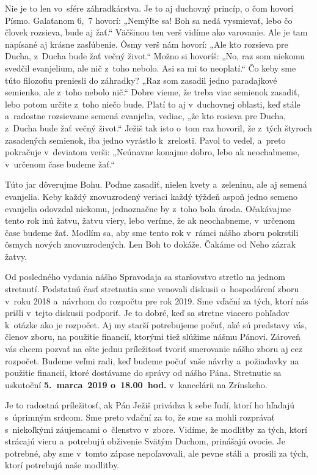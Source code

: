 Nie je to len vo~sfére záhradkárstva. Je to aj duchovný princíp, o čom hovorí Písmo. Galaťanom 6,~7 hovorí: „Nemýľte sa! Boh sa nedá vysmievať, lebo čo človek rozsieva, bude aj žať.“ Väčšinou ten verš vidíme ako varovanie. Ale je tam napísané aj krásne zasľúbenie. Ôsmy verš nám hovorí: „Ale kto rozsieva pre Ducha, z~Ducha bude žať večný život.“ Možno si hovoríš: „No, raz som niekomu svedčil evanjelium, ale nič z~toho nebolo. Asi sa mi to neoplatí.“ Čo keby sme túto filozofiu preniesli do záhradky? „Raz som zasadil jedno paradajkové semienko, ale z~toho nebolo nič.“ Dobre vieme, že treba viac semienok zasadiť, lebo potom určite z~toho niečo bude. Platí to aj v~duchovnej oblasti, keď stále a~radostne rozsievame semená evanjelia, vediac, „že kto rosieva pre Ducha, z~Ducha bude žať večný život.“ Ježiš tak isto o~tom raz hovoril, že z~tých štyroch zasadených semienok, iba jedno vyrástlo k~zrelosti. Pavol to vedel, a~preto pokračuje v~deviatom verši: „Neúnavne konajme dobro, lebo ak neochabneme, v~určenom čase budeme žať.“

Túto jar dôverujme Bohu. Poďme zasadiť, nielen kvety a~zeleninu, ale aj semená evanjelia. Keby každý znovuzrodený veriaci každý týždeň aspoň jedno semeno evanjelia odovzdal niekomu, jednoznačne by z~toho bola úroda. Očakávajme tento rok inú žatvu, žatvu viery, lebo veríme, že ak neochabneme, v~určenom čase budeme žať. Modlím sa, aby sme tento rok v~rámci nášho zboru pokrstili ôsmych nových znovuzrodených. Len Boh to dokáže. Čakáme od Neho zázrak žatvy.



Od posledného vydania nášho Spravodaja sa staršovstvo stretlo na jednom stretnutí. Podstatnú časť stretnutia sme venovali diskusii o~hospodárení zboru v~roku 2018 a~návrhom do rozpočtu pre rok 2019. Sme vďační za tých, ktorí nás prišli v~tejto diskusii podporiť. Je to dobré, keď sa stretne viacero pohľadov k~otázke ako je rozpočet. Aj my starší potrebujeme počuť, aké sú predstavy vás, členov zboru, na použitie financií, ktorými tiež slúžime nášmu Pánovi. Zároveň vás chcem pozvať na ešte jednu príležitosť tvoriť smerovanie nášho zboru aj cez rozpočet. Budeme veľmi radi, keď budeme počuť vaše návrhy a~požiadavky na použitie financií, ktoré dostávame do správy od nášho Pána.  Stretnutie sa uskutoční  {\bf 5.~marca~2019 o~18.00~hod.} v~kancelárii na Zrínskeho.

Je to radostná príležitosť, ak Pán Ježiš privádza k sebe ľudí, ktorí ho hľadajú s~úprimným srdcom. Sme preto vďační za to, že sme sa mohli rozprávať s~niekoľkými záujemcami o~členstvo v~zbore. Vidíme, že modlitby za tých, ktorí strácajú vieru a~potrebujú obživenie Svätým Duchom, prinášajú ovocie. Je potrebné, aby sme v~tomto zápase nepoľavovali, ale pevne stáli a~prosili za tých, ktorí potrebujú naše modlitby.

